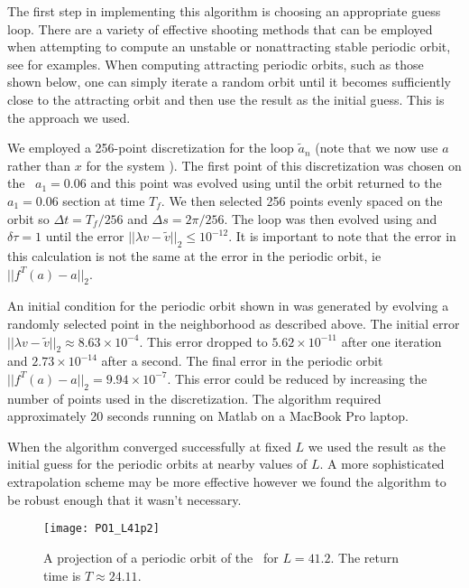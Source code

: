 \documentclass[aip,cha,reprint,
secnumarabic,
nofootinbib, tightenlines,
nobibnotes, showkeys, showpacs,
groupedaddress
]{revtex4-1}
\begin{document}
The first step in implementing this algorithm is choosing an appropriate
guess loop. There are a variety of effective shooting methods that can be
employed when attempting to compute an unstable or nonattracting stable
periodic orbit, see  for examples.  When computing
attracting periodic orbits, such as those shown below, one can simply
iterate a random orbit until it becomes sufficiently close to the
attracting orbit and then use the result as the initial guess.  This is
the approach we used.

We employed a 256-point discretization for the loop $\tilde{a}_n$ (note
that we now use $a$ rather than $x$ for the system ).  The
first point of this discretization was chosen on the \PoincSec\
$a_1=0.06$ and this point was evolved using  until the
orbit returned to the $a_1=0.06$ section at time $T_f$.  We then selected
256 points evenly spaced on the orbit so $\Delta t= T_f/256$ and $\Delta
s=2\pi/256$.  The loop was then evolved using \refeq{POEqnDisc} and
$\delta\tau=1$ until the error $||\lambda v- \tilde{v}||_{2} \leq
10^{-12}$.  It is important to note that the error in this calculation is
not the same at the error in the periodic orbit, ie $||  f^T(a)- a ||_2$.

An initial condition for the periodic orbit shown in 
was generated by evolving a randomly selected point in the neighborhood
as described above. The initial error $||\lambda v- \tilde{v}||_{2}
\approx 8.63 \times 10^{-4}$.  This error dropped to $5.62 \times
10^{-11}$ after one iteration and $2.73\times 10^{-14}$ after a second.
The final error in the periodic orbit $||  f^T(a)- a ||_2=9.94\times10^{-7}$.
This error could be reduced by increasing the number of points used in
the discretization.  The algorithm required approximately 20 seconds
running on Matlab %
on a MacBook Pro laptop.

When the algorithm converged successfully at fixed $L$ we used the result
as the initial guess for the periodic orbits at nearby values of $L$.  A
more sophisticated extrapolation scheme may be more effective however we
found the algorithm to be robust enough that it wasn't necessary.

 \begin{figure}[!h]
\centering
\texttt{[image: PO1\_L41p2]}
  \caption{
 A projection of a periodic orbit of the \KSe\ for $L=41.2$.  The return time is $T \approx 24.11$.
   }
  \label{fig:POrbit}
 \end{figure}
\end{document}
